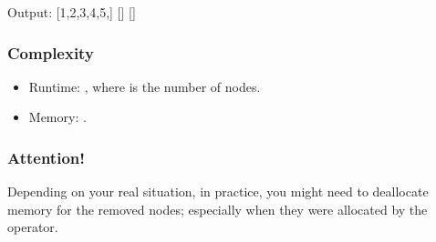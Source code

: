 \documentclass[letterpaper,12pt,english]{book}
\begin{document}
\begin{sphinxVerbatim}[commandchars=\\\{\}]

\end{sphinxVerbatim}

\begin{sphinxVerbatim}[commandchars=\\\{\}]
Output:
[1,2,3,4,5,]
[]
[]
\end{sphinxVerbatim}


\subsubsection{Complexity}
\label{\detokenize{Linked_List/02_LL_203_Remove_Linked_List_Elements:id2}}\begin{itemize}
\item {} 
\sphinxAtStartPar
Runtime: , where  is the number of nodes.

\item {} 
\sphinxAtStartPar
Memory: .

\end{itemize}


\subsubsection{Attention!}
\label{\detokenize{Linked_List/02_LL_203_Remove_Linked_List_Elements:attention}}
\sphinxAtStartPar
Depending on your real situation, in practice, you might need to deallocate memory for the removed nodes; especially when they were allocated by the  operator.
\end{document}
